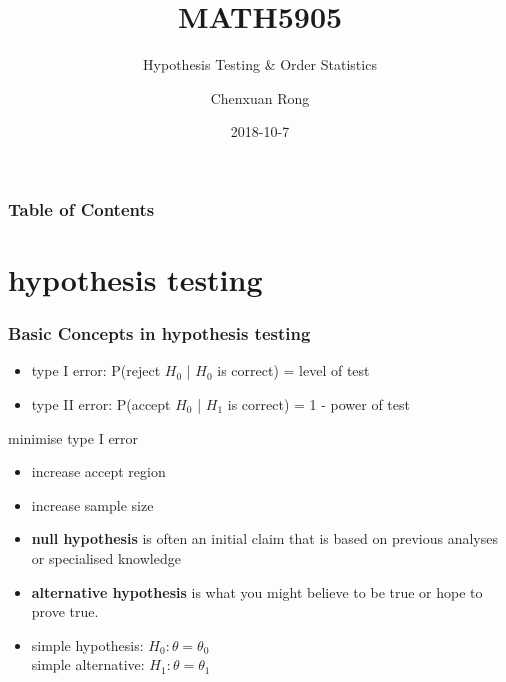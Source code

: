 \documentclass{beamer}
\title{MATH5905}
\subtitle{Hypothesis Testing \& Order Statistics}
\author{Chenxuan Rong}
\date{2018-10-7}
\begin{document}
 
\frame{\titlepage}
 
\begin{frame}
    \frametitle{Table of Contents}
\tableofcontents
\end{frame}

\section{hypothesis testing}
    \begin{frame}
        \frametitle{Basic Concepts in hypothesis testing}
        

        \begin{itemize}
            \item 
            type I error: P(reject $H_0$ | $H_0$ is correct) = level of test
            \item
            type II error: P(accept $H_0$ | $H_1$ is correct) = 1 - power of test
        \end{itemize}
        
        \begin{block}{minimise type I error}
        \begin{itemize}
            \item increase accept region
            \item increase sample size
        \end{itemize}
        \end{block}
        

        \begin{itemize}
            \item
            \textbf{null hypothesis} is often an initial claim that is based on previous analyses or specialised knowledge
            \item
            \textbf{alternative hypothesis} is what you might believe to be true or hope to prove true.
            \item
            simple hypothesis: $H_0:\theta = \theta_0$\\
            simple alternative: $H_1: \theta = \theta_1$
        \end{itemize}
    \end{frame}
    
\end{document}
